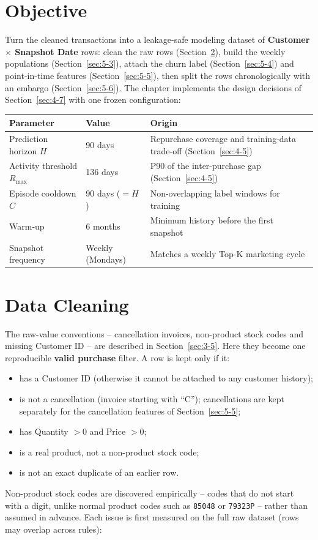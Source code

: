 \section{Objective}
\label{sec:5-1}

Turn the cleaned transactions into a leakage-safe modeling dataset of \textbf{Customer $\times$ Snapshot Date} rows: clean the raw rows (Section~\ref{sec:5-2}), build the weekly populations (Section~\ref{sec:5-3}), attach the churn label (Section~\ref{sec:5-4}) and point-in-time features (Section~\ref{sec:5-5}), then split the rows chronologically with an embargo (Section~\ref{sec:5-6}). The chapter implements the design decisions of Section~\ref{sec:4-7} with one frozen configuration:

\begin{center}
\begin{tabular}{@{}p{5.2cm}p{2.6cm}p{6.3cm}@{}}
    \toprule
    Parameter & Value & Origin \\
    \midrule
    Prediction horizon $H$ & 90 days & Repurchase coverage and training-data trade-off (Section~\ref{sec:4-5}) \\
    Activity threshold $R_{\max}$ & 136 days & P90 of the inter-purchase gap (Section~\ref{sec:4-5}) \\
    Episode cooldown $C$ & 90 days ($= H$) & Non-overlapping label windows for training \\
    Warm-up & 6 months & Minimum history before the first snapshot \\
    Snapshot frequency & Weekly (Mondays) & Matches a weekly Top-K marketing cycle \\
    \bottomrule
\end{tabular}
\end{center}

\section{Data Cleaning}
\label{sec:5-2}

The raw-value conventions -- cancellation invoices, non-product stock codes and missing Customer ID -- are described in Section~\ref{sec:3-5}. Here they become one reproducible \textbf{valid purchase} filter. A row is kept only if it:
\begin{itemize}
    \item has a Customer ID (otherwise it cannot be attached to any customer history);
    \item is not a cancellation (invoice starting with ``C''); cancellations are kept separately for the cancellation features of Section~\ref{sec:5-5};
    \item has Quantity $> 0$ and Price $> 0$;
    \item is a real product, not a non-product stock code;
    \item is not an exact duplicate of an earlier row.
\end{itemize}
Non-product stock codes are discovered empirically -- codes that do not start with a digit, unlike normal product codes such as \texttt{85048} or \texttt{79323P} -- rather than assumed in advance. Each issue is first measured on the full raw dataset (rows may overlap across rules):

